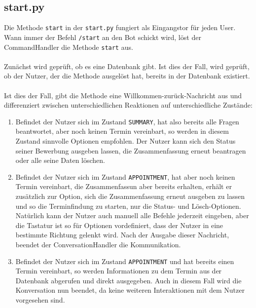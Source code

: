         \subsection{start.py} \label{start.py}
            Die Methode \verb|start| in der \verb|start.py| fungiert als Eingangstor für jeden User. Wann immer der Befehl \verb|/start| an den Bot schickt wird, löst der CommandHandler die Methode \verb|start| aus.\\
            \\
            Zunächst wird geprüft, ob es eine Datenbank gibt. Ist dies der Fall, wird geprüft, ob der Nutzer, der die Methode ausgelöst hat, bereits in der Datenbank existiert. \\
            \\
            Ist dies der Fall, gibt die Methode eine Willkommen-zurück-Nachricht aus und differenziert zwischen unterschiedlichen Reaktionen auf unterschiedliche Zustände:
            \begin{enumerate}
                \item Befindet der Nutzer sich im Zustand \verb|SUMMARY|, hat also bereits alle Fragen beantwortet, aber noch keinen Termin vereinbart, so werden in diesem Zustand sinnvolle Optionen empfohlen. Der Nutzer kann sich den Status seiner Bewerbung ausgeben lassen, die Zusammenfassung erneut beantragen oder alle seine Daten löschen.
                \item Befindet der Nutzer sich im Zustand \verb|APPOINTMENT|, hat aber noch keinen Termin vereinbart, die Zusammenfassun aber bereits erhalten, erhält er zusätzlich zur Option, sich die Zusammenfassung erneut ausgeben zu lassen und so die Terminfindung zu starten, nur die Status- und Lösch-Optionen. Natürlich kann der Nutzer auch manuell alle Befehle jederzeit eingeben, aber die Tastatur ist so für Optionen vordefiniert, dass der Nutzer in eine bestimmte Richtung gelenkt wird. Nach der Ausgabe dieser Nachricht, beendet der ConversationHandler die Kommunikation.
                \item Befindet der Nutzer sich im Zustand \verb|APPOINTMENT| und hat bereits einen Termin vereinbart, so werden Informationen zu dem Termin aus der Datenbank abgerufen und direkt ausgegeben. Auch in diesem Fall wird die Konversation nun beendet, da keine weiteren Interaktionen mit dem Nutzer vorgesehen sind.
            \end{enumerate}


